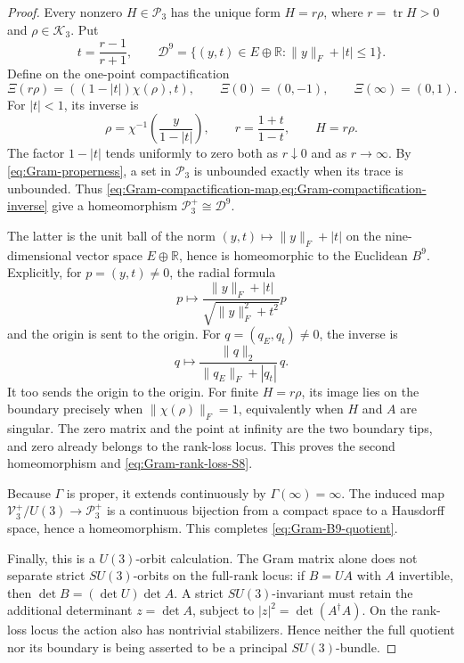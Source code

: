 \documentclass[11pt,letterpaper]{article}
\numberwithin{equation}{section}
\theoremstyle{definition}
\theoremstyle{remark}
\newcommand{\R}{\mathbb R}
\begin{document}
\begin{proof}
Every nonzero \(H\in\mathcal P_3\) has the unique form
\(H=r\rho\), where \(r=\operatorname{tr}H>0\) and
\(\rho\in\mathcal K_3\).  Put
\[
 t=\frac{r-1}{r+1},
 \qquad
 \mathcal D^9=\{(y,t)\in E\oplus\R:\|y\|_F+|t|\leq1\}.
\]
Define on the one-point compactification
\begin{equation}
 \Xi(r\rho)=((1-|t|)\chi(\rho),t),
 \qquad
 \Xi(0)=(0,-1),
 \qquad
 \Xi(\infty)=(0,1).
 \label{eq:Gram-compactification-map}
\end{equation}
For \(|t|<1\), its inverse is
\begin{equation}
 \rho=\chi^{-1}\!\left(\frac{y}{1-|t|}\right),
 \qquad r=\frac{1+t}{1-t},
 \qquad H=r\rho.
 \label{eq:Gram-compactification-inverse}
\end{equation}
The factor \(1-|t|\) tends uniformly to zero both as \(r\downarrow0\)
and as \(r\to\infty\).  By \cref{eq:Gram-properness}, a set
in \(\mathcal P_3\) is unbounded exactly when its trace is unbounded.
Thus \cref{eq:Gram-compactification-map,eq:Gram-compactification-inverse}
give a homeomorphism \(\mathcal P_3^+\cong\mathcal D^9\).

The latter is the unit ball of the norm
\((y,t)\mapsto\|y\|_F+|t|\) on the nine-dimensional vector space
\(E\oplus\R\), hence is homeomorphic to the Euclidean \(B^9\).  Explicitly,
for \(p=(y,t)\ne0\), the radial formula
\begin{equation}
 p\longmapsto
 \frac{\|y\|_F+|t|}{\sqrt{\|y\|_F^2+t^2}}p
 \label{eq:Gram-double-cone-radial-map}
\end{equation}
and the origin is sent to the origin.  For \(q=(q_E,q_t)\ne0\), the
inverse is
\[
 q\longmapsto
 \frac{\|q\|_2}{\|q_E\|_F+|q_t|}\,q.
\]
It too sends the origin to the origin.
For finite \(H=r\rho\), its image lies on the boundary precisely when
\(\|\chi(\rho)\|_F=1\), equivalently when \(H\) and \(A\) are singular.
The zero matrix and the point at infinity are the two boundary tips, and
zero already belongs to the rank-loss locus.  This proves the second
homeomorphism and \cref{eq:Gram-rank-loss-S8}.

Because \(\Gamma\) is proper, it extends continuously by
\(\Gamma(\infty)=\infty\).  The induced map
\(\mathcal V_3^+/U(3)\to\mathcal P_3^+\) is a continuous bijection from a
compact space to a Hausdorff space, hence a homeomorphism.  This completes
\cref{eq:Gram-B9-quotient}.

Finally, this is a \(U(3)\)-orbit calculation.  The Gram matrix alone does
not separate strict \(SU(3)\)-orbits on the full-rank locus: if
\(B=UA\) with \(A\) invertible, then
\(\det B=(\det U)\det A\).  A strict \(SU(3)\)-invariant must retain the
additional determinant \(z=\det A\), subject to
\(|z|^2=\det(A^\dagger A)\).  On the rank-loss locus the action also has
nontrivial stabilizers.  Hence neither the full quotient nor its boundary
is being asserted to be a principal \(SU(3)\)-bundle.
\end{proof}
\end{document}

